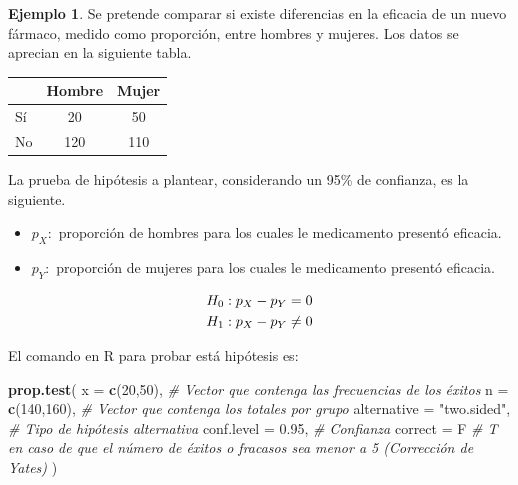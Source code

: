 \documentclass[
  11pt,
]{book}
\newenvironment{Shaded}{\begin{snugshade}}{\end{snugshade}}
\newcommand{\AttributeTok}[1]{\textcolor[rgb]{0.13,0.29,0.53}{#1}}
\newcommand{\CommentTok}[1]{\textcolor[rgb]{0.56,0.35,0.01}{\textit{#1}}}
\newcommand{\DecValTok}[1]{\textcolor[rgb]{0.00,0.00,0.81}{#1}}
\newcommand{\FloatTok}[1]{\textcolor[rgb]{0.00,0.00,0.81}{#1}}
\newcommand{\FunctionTok}[1]{\textcolor[rgb]{0.13,0.29,0.53}{\textbf{#1}}}
\newcommand{\NormalTok}[1]{#1}
\newcommand{\StringTok}[1]{\textcolor[rgb]{0.31,0.60,0.02}{#1}}
\providecommand{\tightlist}{%
  \setlength{\itemsep}{0pt}\setlength{\parskip}{0pt}}
\theoremstyle{definition}
\theoremstyle{definition}
\newtheorem{example}{Ejemplo}[chapter]
\theoremstyle{definition}
\theoremstyle{definition}
\theoremstyle{remark}
\begin{document}
\begin{example}
Se pretende comparar si existe diferencias en la eficacia de un nuevo fármaco, medido como proporción, entre hombres y mujeres. Los datos se aprecian en la siguiente tabla.

\begin{table}[H]
\centering
\begin{tabular}[t]{lcc}
\toprule
  & Hombre & Mujer\\
\midrule
Sí & 20 & 50\\
No & 120 & 110\\
\bottomrule
\end{tabular}
\end{table}

La prueba de hipótesis a plantear, considerando un 95\% de confianza, es la siguiente.

\begin{itemize}
\tightlist
\item
  \(p_X:\) proporción de hombres para los cuales le medicamento presentó eficacia.
\item
  \(p_Y:\) proporción de mujeres para los cuales le medicamento presentó eficacia.
\end{itemize}

\begin{equation}
\notag
\begin{split}
H_0&: p_X - p_Y = 0\\
H_1&: p_X - p_Y \neq 0\\
\end{split}
\end{equation}

El comando en R para probar está hipótesis es:

\begin{Shaded}
\begin{Highlighting}[]
\FunctionTok{prop.test}\NormalTok{(}
  \AttributeTok{x =} \FunctionTok{c}\NormalTok{(}\DecValTok{20}\NormalTok{,}\DecValTok{50}\NormalTok{), }\CommentTok{\# Vector que contenga las frecuencias de los éxitos}
  \AttributeTok{n =} \FunctionTok{c}\NormalTok{(}\DecValTok{140}\NormalTok{,}\DecValTok{160}\NormalTok{), }\CommentTok{\# Vector que contenga los totales por grupo}
  \AttributeTok{alternative =} \StringTok{"two.sided"}\NormalTok{, }\CommentTok{\# Tipo de hipótesis alternativa}
  \AttributeTok{conf.level =} \FloatTok{0.95}\NormalTok{, }\CommentTok{\# Confianza}
  \AttributeTok{correct =}\NormalTok{ F }\CommentTok{\# T en caso de que el número de éxitos o fracasos sea menor a 5 (Corrección de Yates)}
\NormalTok{)}
\end{Highlighting}
\end{Shaded}


\end{example}
\end{document}
